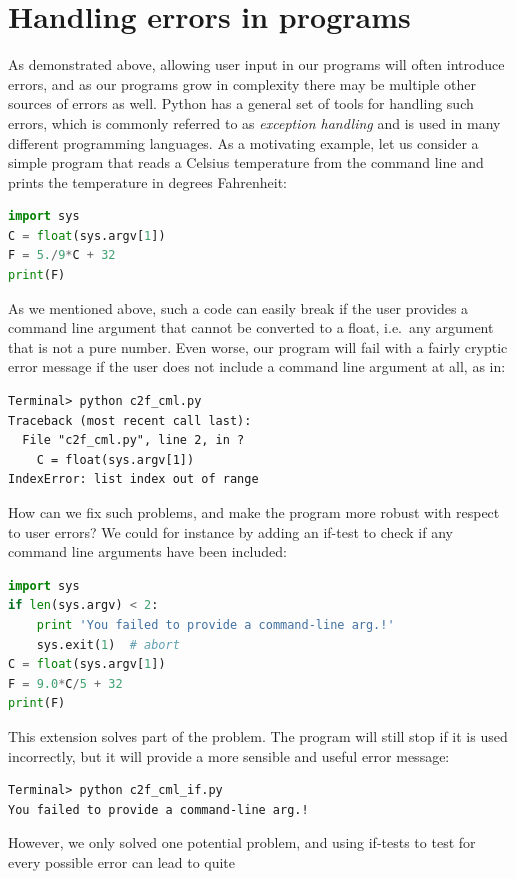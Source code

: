 \documentclass[graybox,envcountchap,sectrefs,final]{svmonodo}
\begin{document}
\section{Handling errors in programs}
As demonstrated above, allowing user input in our programs will often introduce errors, and as our programs grow in
complexity there may be multiple other sources of errors as well. Python has a general set of tools for handling such errors,
which is commonly referred to as \emph{exception handling} and is used in many different programming languages. As a motivating
example, let us consider a simple program that reads a Celsius temperature from the command line and prints the
temperature in degrees Fahrenheit:
\begin{lstlisting}[language=Python,style=blue1bar]
import sys
C = float(sys.argv[1])
F = 5./9*C + 32
print(F)
\end{lstlisting}
As we mentioned above, such a code can easily break if the user provides a command line argument that cannot be converted to a
float, i.e.~any argument that is not a pure number. Even worse, our program will fail with a fairly cryptic error message
if the user does not include a command line argument at all, as in:
\begin{Verbatim}[frame=lines,label=\fbox{{\tiny Terminal}},framesep=2.5mm,framerule=0.7pt]
Terminal> python c2f_cml.py
Traceback (most recent call last):
  File "c2f_cml.py", line 2, in ?
    C = float(sys.argv[1])
IndexError: list index out of range
\end{Verbatim}
How can we fix such problems, and make the program more robust with respect to user errors? We could for instance by adding an if-test to check if any command line arguments
have been included:
\begin{lstlisting}[language=Python,style=blue1]
import sys
if len(sys.argv) < 2:
    print 'You failed to provide a command-line arg.!'
    sys.exit(1)  # abort
C = float(sys.argv[1])
F = 9.0*C/5 + 32
print(F)
\end{lstlisting}
This extension solves part of the problem. The program will still stop if it is used incorrectly, but
it will provide a more sensible and useful error message:
\begin{Verbatim}[frame=lines,label=\fbox{{\tiny Terminal}},framesep=2.5mm,framerule=0.7pt]
Terminal> python c2f_cml_if.py
You failed to provide a command-line arg.!
\end{Verbatim}
However, we only solved one potential problem, and using if-tests to test for every possible error can lead to quite
\end{document}
